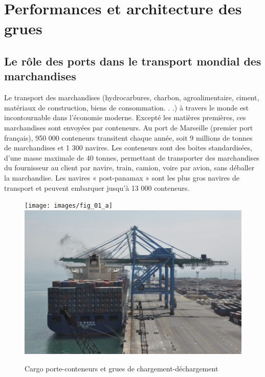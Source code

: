 \documentclass[10pt,fleqn]{article} %
\begin{document}

\vspace{5cm}
\pagestyle{fancy}
\thispagestyle{plain}

\def\columnseprulecolor{\color{white}}
\setlength{\columnseprule}{0.4pt} 



\section{Performances et architecture des grues}
\subsection{Le rôle des ports dans le transport mondial des marchandises}
Le transport des marchandises (hydrocarbures, charbon, agroalimentaire, ciment, matériaux de construction,
biens de consommation. . .) à travers le monde est incontournable dans l’économie moderne. Excepté les matières
premières, ces marchandises sont envoyées par conteneurs. Au port de Marseille (premier port français), 950 000
conteneurs transitent chaque année, soit 9 millions de tonnes de marchandises et 1 300 navires.
Les conteneurs sont des boites standardisées, d’une masse maximale de 40 tonnes, permettant de transporter des
marchandises du fournisseur au client par navire, train, camion, voire par avion, sans déballer la marchandise.
Les navires « post-panamax » sont les plus gros navires de transport et peuvent embarquer jusqu’à 13 000
conteneurs.




\begin{figure}[H]
\centering
\texttt{[image: images/fig\_01\_a]}
\includegraphics[width=.48\linewidth]{images/fig_01_b}
\caption{Cargo porte-conteneurs et grues de chargement-déchargement \label{fig_01}}
\end{figure}
\end{document}
